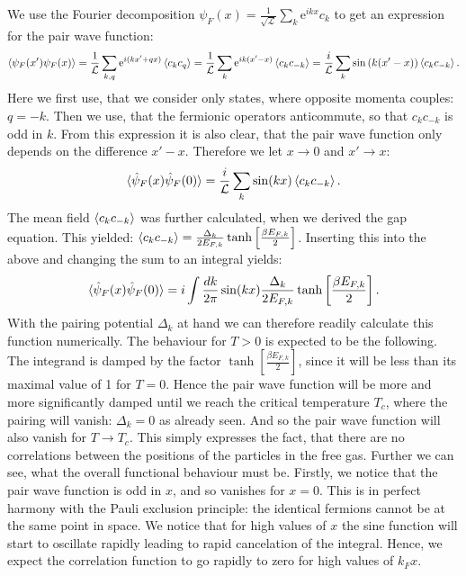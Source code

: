 We use the Fourier decomposition $\psi_F(x) = \frac{1}{\sqrt{\mathcal{L}}} \sum_k \text{e}^{ikx} c_k$ to get an expression for the pair wave function:
\begin{equation}
\braket{\psi_F(x')\psi_F(x)} = \frac{1}{\mathcal{L}} \sum_{k,q} \text{e}^{i(kx' + qx)}\braket{c_{k}c_{q}} = \frac{1}{\mathcal{L}} \sum_{k} \text{e}^{ik(x' - x)}\braket{c_{k}c_{-k}} = \frac{i}{\mathcal{L}} \sum_{k} \sin\left(k(x' - x)\right)\braket{c_{k}c_{-k}}. \nonumber 
\end{equation}
Here we first use, that we consider only states, where opposite momenta couples: $q = -k$. Then we use, that the fermionic operators anticommute, so that $c_kc_{-k}$ is odd in $k$. From this expression it is also clear, that the pair wave function only depends on the difference $x'-x$. Therefore we let $x \to 0$ and $x' \to x$:
\begin{equation}
\braket{\hat{\psi}_F(x) \hat{\psi}_F(0)} = \frac{i}{\mathcal{L}}\sum_{k} \sin(kx)\braket{c_{k}c_{-k}}. \nonumber
\end{equation}
The mean field $\braket{c_{k}c_{-k}}$ was further calculated, when we derived the gap equation. This yielded: $\braket{c_{k}c_{-k}} = \frac{\Delta_k}{2E_{F,k}}\tanh\left[\frac{\beta E_{F,k} }{2}\right]$. Inserting this into the above and changing the sum to an integral yields:
\begin{equation}
\braket{\hat{\psi}_F(x) \hat{\psi}_F(0)} = i\int \frac{dk}{2\pi} \sin(kx)\frac{\Delta_k}{2E_{F,k}}\tanh\left[\frac{ \beta E_{F,k} }{2}\right].
\label{eq.pairwavefunction}
\end{equation}
With the pairing potential $\Delta_k$ at hand we can therefore readily calculate this function numerically. The behaviour for $T > 0$ is expected to be the following. The integrand is damped by the factor $\tanh\left[\frac{ \beta E_{F,k} }{2}\right]$, since it will be less than its maximal value of 1 for $T = 0$. Hence the pair wave function will be more and more significantly damped until we reach the critical temperature $T_c$, where the pairing will vanish: $\Delta_k = 0$ as already seen. And so the pair wave function will also vanish for $T\to T_c$. This simply expresses the fact, that there are no correlations between the positions of the particles in the free gas. Further we can see, what the overall functional behaviour must be. Firstly, we notice that the pair wave function is odd in $x$, and so vanishes for $x = 0$. This is in perfect harmony with the Pauli exclusion principle: the identical fermions cannot be at the same point in space. We notice that for high values of $x$ the sine function will start to oscillate rapidly leading to rapid cancelation of the integral. Hence, we expect the correlation function to go rapidly to zero for high values of $k_F x$. 


